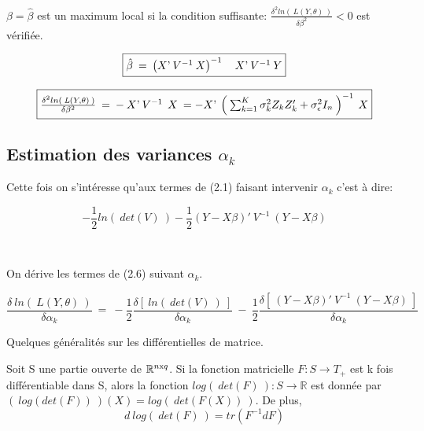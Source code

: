 \documentclass[11pt,fleqn]{book} %
\begin{document}
	\vspace{1em}
	
	$\beta=\hat{\beta}$ est un maximum local si la condition suffisante: $\frac{\delta^2 ln(\:\textit{L}(Y,\theta)\:)}{\delta\beta^2}<0$ est vérifiée.
	
	
	\begin{equation} 
		\fbox{$
			\hat{\beta}\:=\:\left(  X\textnormal{'}\:V^{-1} \: X \right)^{-1} \quad X\textnormal{'} \:V^{-1}\: Y 
			$}
	\end{equation}
	
	\begin{equation}
		\fbox{$
			\frac{\delta^2 ln(\:\textit{L}(Y,\theta)\:)}{\delta\beta^2} \:=\: -\: X\textnormal{'} \:V^{-1}\:\: X
			\:= - X\textnormal{'} \: \left( \: \sum_{k=1}^{K} \sigma_k^2 Z_k Z_k'+\sigma_{\epsilon}^2 I_{n} \:\right)^{-1}\: X $}
	\end{equation}
	
	\vspace{2em} 
	
	
	\subsection{Estimation des variances $\alpha_k$}
	
	\vspace{2em}
	
	Cette fois on s'intéresse qu'aux termes de (2.1) faisant intervenir $\alpha_k$ c'est à dire: 
	
	\begin{equation}
		-\frac{1}{2} ln(\:det(V)\:) -\frac{1}{2}  (Y-X\beta)'\:V^{-1}\:(Y-X\beta) 
	\end{equation}
	
	\
	
	On dérive les termes de (2.6) suivant $\alpha_k$.
	
	\begin{equation} 
		\frac{\delta\: ln(\:\textit{L}(Y,\theta)\:) }{\delta \alpha_k} \:=\: -\frac{1}{2}  \frac{ \delta \left[\:ln(\:det(V)\:) \:\right] }{\delta \alpha_k} \:-\: \frac{1}{2}  \frac{\delta \left[\: (Y-X\beta)'\:V^{-1}\:(Y-X\beta)\:\right] }{\delta \alpha_k} 
	\end{equation}
	
	\newpage
	
	Quelques généralités sur les différentielles de matrice. 
	
	\vspace{1em}
	
	\begin{theorem}
		Soit S une partie ouverte de $\mathbb{R}^{n\textnormal{x}q}$. Si la fonction matricielle $F:S\rightarrow T_{+}$ est k fois différentiable dans S, alors la fonction $log(\:det(F)\:):S\rightarrow \mathbb{R}$ est donnée par $(\:log(det(F))\:)(X)=log(\:det(F(X))\:)$. De plus,
		\[ d\:log(\:det(F)\:)=tr(F^{-1} dF) \]
	\end{theorem}
	
\end{document}

